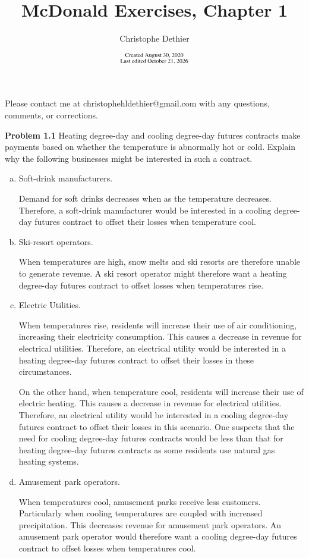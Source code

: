 \documentclass[12pt]{article}
\title{McDonald Exercises, Chapter 1}
\author{Christophe Dethier}
\date{$\substack{\text{Created August 30, 2020}\\\text{Last edited \today}}$}
\newcommand{\problem}[1]{\bigskip \noindent \textbf{Problem #1}}
\theoremstyle{plain}
\begin{document}
\bigskip
\maketitle

Please contact me at christophehldethier@gmail.com with any questions, comments, or corrections.

\problem{1.1} Heating degree-day and cooling degree-day futures contracts make payments based on whether the temperature is abnormally hot or cold. Explain why the following businesses might be interested in such a contract.

\begin{enumerate}[(a)]
 
\item Soft-drink manufacturers.

Demand for soft drinks decreases when as the temperature decreases. Therefore, a soft-drink manufacturer would be interested in a cooling degree-day futures contract to offset their losses when temperature cool.

\item Ski-resort operators.

When temperatures are high, snow melts and ski resorts are therefore unable to generate revenue. A ski resort operator might therefore want a heating degree-day futures contract to offset losses when temperatures rise.

\item Electric Utilities.

When temperatures rise, residents will increase their use of air conditioning, increasing their electricity consumption. This causes a decrease in revenue for electrical utilities. Therefore, an electrical utility would be interested in a heating degree-day futures contract to offset their losses in these circumstances.

On the other hand, when temperature cool, residents will increase their use of electric heating. This causes a decrease in revenue for electrical utilities. Therefore, an electrical utility would be interested in a cooling degree-day futures contract to offset their losses in this scenario. One suspects that the need for cooling degree-day futures contracts would be less than that for heating degree-day futures contracts as some residents use natural gas heating systems.

\item Amusement park operators.

When temperatures cool, amusement parks receive less customers. Particularly when cooling temperatures are coupled with increased precipitation. This decreases revenue for amusement park operators. An amusement park operator would therefore want a cooling degree-day futures contract to offset losses when temperatures cool.

\end{enumerate}
\end{document}
